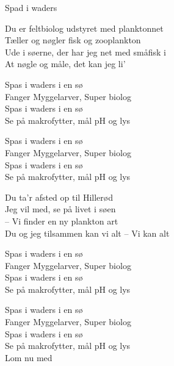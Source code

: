 \begin{song}{Spad i waders}
  \begin{SBVerse}
Du er feltbiolog udstyret med planktonnet\\
Tæller og nøgler fisk og zooplankton\\
Ude i søerne, der har jeg net med småfisk i\\
At nøgle og måle, det kan jeg li'
  \end{SBVerse}

  \begin{SBChorus}
Spas i waders i en sø\\
Fanger Myggelarver, Super biolog\\
Spas i waders i en sø\\
Se på makrofytter, mål pH og lys
  \end{SBChorus}

  \begin{SBChorus}
Spas i waders i en sø\\
Fanger Myggelarver, Super biolog\\
Spas i waders i en sø\\
Se på makrofytter, mål pH og lys
  \end{SBChorus}



  \begin{SBSection*}
Du ta'r afsted op til Hillerød\\
Jeg vil med, se på livet i søen\\
 -- Vi finder en ny plankton art\\
Du og jeg tilsammen kan vi alt
 -- Vi kan alt
  \end{SBSection*}

  \begin{SBChorus}
Spas i waders i en sø\\
Fanger Myggelarver, Super biolog\\
Spas i waders i en sø\\
Se på makrofytter, mål pH og lys\
  \end{SBChorus}

  \begin{SBChorus}
Spas i waders i en sø\\
Fanger Myggelarver, Super biolog\\
Spas i waders i en sø\\
Se på makrofytter, mål pH og lys\\
Lom nu med
  \end{SBChorus}


\end{song}
